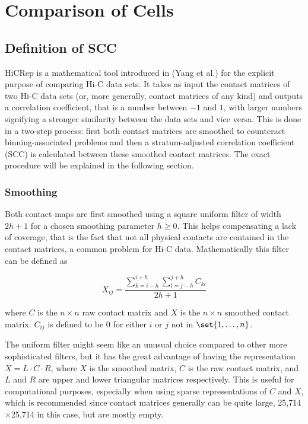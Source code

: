 
\chapter{Comparison of Cells} %
\label{cha:comparison_of_cells}

\section{Definition of SCC} %
\label{sec:definition_of_scc}

HiCRep is a mathematical tool introduced in (Yang et al.\cite{yang_hicrep_2017}) for the explicit purpose of comparing Hi-C data sets. It takes as input the contact matrices of two Hi-C data sets (or, more generally, contact matrices of any kind) and outputs a correlation coefficient, that is a number between \(-1\) and \(1\), with larger numbers signifying a stronger similarity between the data sets and vice versa. This is done in a two-step process: first both contact matrices are smoothed to counteract binning-associated problems and then a stratum-adjusted correlation coefficient (SCC) is calculated between these smoothed contact matrices. The exact procedure will be explained in the following section.

\subsection{Smoothing} %
\label{subsec:smoothing}

Both contact maps are first smoothed using a square uniform filter of width \(2h+1\) for a chosen smoothing parameter \(h \geq 0\). This helps compensating a lack of coverage, that is the fact that not all physical contacts are contained in the contact matrices, a common problem for Hi-C data. Mathematically this filter can be defined as

\[
  X_{ij} = \frac{ \sum_{k=i-h}^{i+h} \sum_{l=j-h}^{j+h} C_{kl} }{ 2h+1 }
\]

where \(C\) is the \(n \times n\) raw contact matrix and \(X\) is the \(n \times n\) smoothed contact matrix. \(C_{ij}\) is defined to be 0 for either \(i\) or \(j\) not in \(\set{1, \dots, n}\).

The uniform filter might seem like an unusual choice compared to other more sophisticated filters, but it has the great advantage of having the representation \( X = L \cdot C \cdot R \), where \(X\) is the smoothed matrix, \(C\) is the raw contact matrix, and \(L\) and \(R\) are upper and lower triangular matrices respectively. This is useful for computational purposes, especially when using sparse representations of \(C\) and \(X\), which is recommended since contact matrices generally can be quite large, 25,714\(\times\)25,714 in this case, but are mostly empty.

